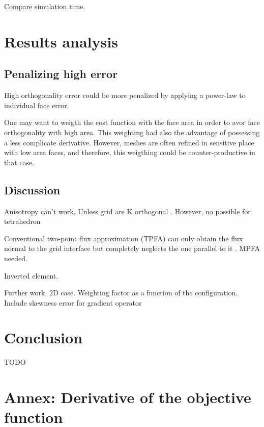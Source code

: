 \documentclass[11pt]{article}
\begin{document}
Compare simulation time.

\section{Results analysis}

\subsection{Penalizing high error}
High orthogonality error could be more penalized by applying a power-law to individual face error. 

One may want to weigth the cost function with the face area in order to avor face orthogonality with high area. 
This weighting had also the advantage of possessing a less complicate derivative. 
However, meshes are often refined in sensitive place with low area faces, and therefore, this weigthing could be counter-productive in that case.

\subsection{Discussion}

Anisotropy can't work.
Unless grid are K orthogonal \cite{heinemann_modelling_1991}.
However, no possible for tetrahedron

Conventional two-point flux approximation (TPFA) can only obtain the flux normal to the grid interface but completely neglects the one parallel to it \cite{}. MPFA needed. %

Inverted element.

Further work.
2D case.
Weighting factor as a function of the configuration.
Include skewness error for gradient operator


\section{Conclusion}

TODO







\clearpage


\section*{Annex: Derivative of the objective function}
\end{document}
